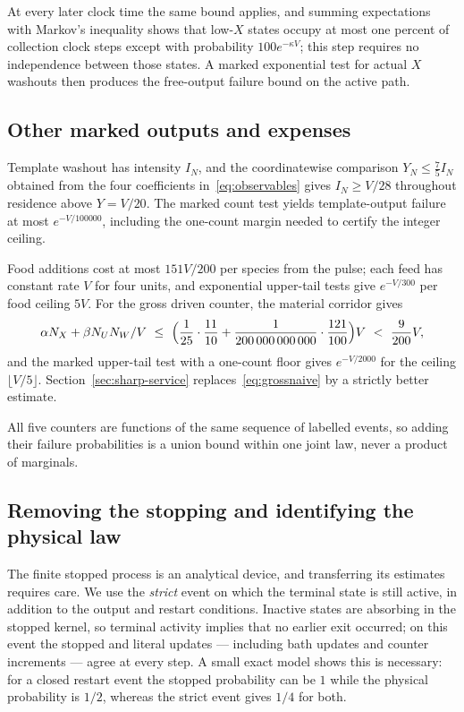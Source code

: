 \documentclass[11pt,a4paper]{article}
\theoremstyle{plain}
\theoremstyle{definition}
\theoremstyle{remark}
\newcommand{\Iv}{I}
\begin{document}
At every later clock time the same bound applies, and summing expectations with Markov's inequality shows that low-$X$ states occupy at most one percent of collection clock steps except with probability $100e^{-\kappa V}$; this step requires no independence between those states. A marked exponential test for actual $X$ washouts then produces the free-output failure bound on the active path.

\subsection{Other marked outputs and expenses}\label{sec:counters}

Template washout has intensity $\Iv_N$, and the coordinatewise comparison $Y_N\le\tfrac75\Iv_N$ obtained from the four coefficients in~\eqref{eq:observables} gives $\Iv_N\ge V/28$ throughout residence above $Y=V/20$. The marked count test yields template-output failure at most $e^{-V/100000}$, including the one-count margin needed to certify the integer ceiling.

Food additions cost at most $151V/200$ per species from the pulse; each feed has constant rate $V$ for four units, and exponential upper-tail tests give $e^{-V/300}$ per food ceiling $5V$. For the gross driven counter, the material corridor gives
\begin{equation}\label{eq:grossnaive}
\alpha N_X+\beta N_UN_W/V\ \le\ \Bigl(\frac1{25}\cdot\frac{11}{10}+\frac1{200\,000\,000\,000}\cdot\frac{121}{100}\Bigr)V\ <\ \frac9{200}V,
\end{equation}
and the marked upper-tail test with a one-count floor gives $e^{-V/2000}$ for the ceiling $\lfloor V/5\rfloor$. Section~\ref{sec:sharp-service} replaces~\eqref{eq:grossnaive} by a strictly better estimate.

All five counters are functions of the same sequence of labelled events, so adding their failure probabilities is a union bound within one joint law, never a product of marginals.

\subsection{Removing the stopping and identifying the physical law}\label{sec:transfer}

The finite stopped process is an analytical device, and transferring its estimates requires care. We use the \emph{strict} event on which the terminal state is still active, in addition to the output and restart conditions. Inactive states are absorbing in the stopped kernel, so terminal activity implies that no earlier exit occurred; on this event the stopped and literal updates --- including bath updates and counter increments --- agree at every step. A small exact model shows this is necessary: for a closed restart event the stopped probability can be $1$ while the physical probability is $1/2$, whereas the strict event gives $1/4$ for both.
\end{document}
